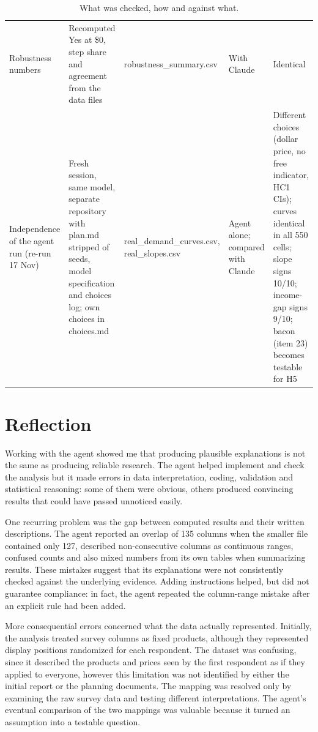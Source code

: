 \documentclass[11pt,a4paper]{article}
\begin{document}
\begin{table}[H]
\begin{tabularx}{\linewidth}{>{\raggedright\arraybackslash}p{2.4cm}L>{\raggedright\arraybackslash}p{2.7cm}>{\raggedright\arraybackslash}p{1.9cm}L}
Robustness numbers & Recomputed Yes at \$0, step share and agreement from the data files & robustness\_\allowbreak{}summary.csv & With Claude & Identical\\
Independence of the agent run (re-run 17 Nov) & Fresh session, same model, separate repository with plan.md stripped of seeds, model specification and choices log; own choices in choices.md & real\_\allowbreak{}demand\_\allowbreak{}curves.csv, real\_\allowbreak{}slopes.csv & Agent alone; compared with Claude & Different choices (dollar price, no free indicator, HC1 CIs); curves identical in all 550 cells; slope signs 10/10; income-gap signs 9/10; bacon (item 23) becomes testable for H5\\
\bottomrule
\end{tabularx}
\caption{What was checked, how and against what.}
\end{table}

\section{Reflection}

Working with the agent showed me that producing plausible explanations is not the same as producing reliable research. The agent helped implement and check the analysis but it made errors in data interpretation, coding, validation and statistical reasoning: some of them were obvious, others produced convincing results that could have passed unnoticed easily.

One recurring problem was the gap between computed results and their written descriptions. The agent reported an overlap of 135 columns when the smaller file contained only 127, described non-consecutive columns as continuous ranges, confused counts and also mixed numbers from its own tables when summarizing results. These mistakes suggest that its explanations were not consistently checked against the underlying evidence. Adding instructions helped, but did not guarantee compliance: in fact, the agent repeated the column-range mistake after an explicit rule had been added.

More consequential errors concerned what the data actually represented. Initially, the analysis treated survey columns as fixed products, although they represented display positions randomized for each respondent. The dataset was confusing, since it described the products and prices seen by the first respondent as if they applied to everyone, however this limitation was not identified by either the initial report or the planning documents. The mapping was resolved only by examining the raw survey data and testing different interpretations. The agent's eventual comparison of the two mappings was valuable because it turned an assumption into a testable question.
\end{document}
